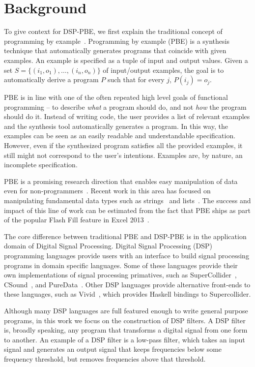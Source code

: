 \section{Background}
\label{sec:background}

To give context for DSP-PBE, we first explain the traditional concept of programming by example~\cite{cypher93,lieberman01,synasc12}.
Programming by example (PBE) is a synthesis technique that automatically generates programs that coincide with given examples.
An example is specified as a tuple of input and output values.
Given a set $S= \{(i_1, o_1),\ldots, (i_n, o_n)\}$ of input/output examples, the goal is to automatically derive a program $P$ such that for every $j$, $P(i_j) = o_j$.

PBE is in line with one of the often repeated high level goals of functional programming -- to describe \textit{what} a program should do, and not \textit{how} the program should do it.
Instead of writing code, the user provides a list of relevant examples and the synthesis tool automatically generates a program.
In this way, the examples can be seen as an easily readable and understandable specification.
However, even if the synthesized program satisfies all the provided examples, it still might not correspond to the user's intentions.
Examples are, by nature, an incomplete specification.

PBE is a promising research direction that enables easy manipulation of data even for non-programmers~\cite{GulwaniHS12}.
Recent work in this area has focused on manipulating fundamental data types such as strings~\cite{vldb12,icml13} and lists~\cite{FeserCD15,poseraZ15}.
The success and impact of this line of work can be estimated from the fact that PBE ships as part of the popular Flash Fill feature in Excel 2013~\cite{flashfill}.


The core difference between traditional PBE and DSP-PBE is in the application domain of Digital Signal Processing.
Digital Signal Processing (DSP) programming languages provide users with an interface to build signal processing programs in domain specific languages.
Some of these languages provide their own implementations of signal processing primatives, such as SuperCollider~\cite{supercollider}, CSound~\cite{csound}, and PureData~\cite{puredata}.
Other DSP languages provide alternative front-ends to these languages, such as Vivid~\cite{vivid}, which provides Haskell bindings to Supercollider.

Although many DSP languages are full featured enough to write general purpose programs, in this work we focus on the construction of DSP filters.
A DSP filter is, broadly speaking, any program that transforms a digital signal from one form to another.
An example of a DSP filter is a low-pass filter, which takes an input signal and generates an output signal that keeps frequencies below some frequency threshold, but removes frequencies above that threshold.

